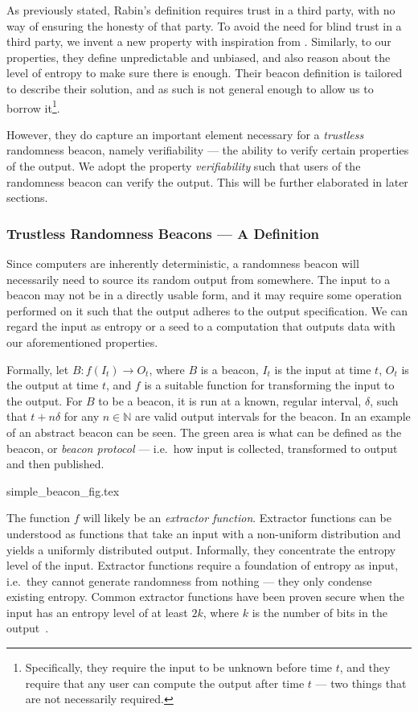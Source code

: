 As previously stated, Rabin's definition requires trust in a third party, with no way of ensuring the honesty of that party.
To avoid the need for blind trust in a third party, we invent a new property with inspiration from \citet{bonneau2015bitcoin}.
Similarly, to our properties, they define unpredictable and unbiased, and also reason about the level of entropy to make sure there is enough.
Their beacon definition is tailored to describe their solution, and as such is not general enough to allow us to borrow it\footnote{Specifically, they require the input to be unknown before time $t$, and they require that any user can compute the output after time $t$ --- two things that are not necessarily required.}.

However, they do capture an important element necessary for a \emph{trustless} randomness beacon, namely verifiability --- the ability to verify certain properties of the output.
We adopt the property \emph{verifiability} such that users of the randomness beacon can verify the output. This will be further elaborated in later sections.

\subsubsection{Trustless Randomness Beacons --- A Definition}
Since computers are inherently deterministic, a randomness beacon will necessarily need to source its random output from somewhere.
The input to a beacon may not be in a directly usable form, and it may require some operation performed on it such that the output adheres to the output specification.
We can regard the input as entropy or a seed to a computation that outputs data with our aforementioned properties.

Formally, let $B: f(I_t) \rightarrow O_t$, where $B$ is a beacon, $I_t$ is the input at time $t$, $O_t$ is the output at time $t$, and $f$ is a suitable function for transforming the input to the output.
For $B$ to be a beacon, it is run at a known, regular interval, $\delta$, such that $t+n\delta$ for any $n \in \mathbb{N}$ are valid output intervals for the beacon.
In  an example of an abstract beacon can be seen.
The green area is what can be defined as the beacon, or \emph{beacon protocol} --- i.e.\ how input is collected, transformed to output and then published.

{simple_beacon_fig.tex}

The function $f$ will likely be an \emph{extractor function}.
Extractor functions can be understood as functions that take an input with a non-uniform distribution and yields a uniformly distributed output.
Informally, they concentrate the entropy level of the input.
Extractor functions require a foundation of entropy as input, i.e.\ they cannot generate randomness from nothing --- they only condense existing entropy.
Common extractor functions have been proven secure when the input has an entropy level of at least $2k$, where $k$ is the number of bits in the output~\cite{dodis2004randomness}.
